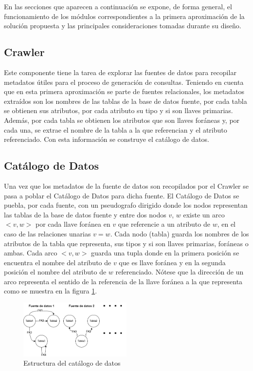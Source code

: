 En las secciones que aparecen a continuación se expone, de forma general, el funcionamiento de los módulos correspondientes a la primera 
aproximación de la solución propuesta y las principales consideraciones tomadas durante
su diseño.

\subsection{Crawler}

Este componente tiene la tarea de explorar las fuentes de datos para recopilar metadatos \'utiles para el proceso de generación
de consultas. Teniendo en cuenta que en esta primera aproximación se parte de fuentes relacionales, los metadatos extra\'idos son 
los nombres de las tablas de la base de datos fuente, por cada tabla se obtienen sus 
atributos, por cada atributo su tipo y si son llaves primarias. Además, por cada tabla se obtienen los atributos que son llaves 
for\'aneas y, por cada una, se extrae el nombre de la tabla a la que referencian y el atributo referenciado. Con esta información se construye 
el catálogo de datos.

\subsection{Catálogo de Datos}

Una vez que los metadatos de la fuente de datos son recopilados por el Crawler se pasa a poblar el Catálogo de Datos para dicha fuente. 
El Cat\'alogo de Datos se puebla, por cada fuente, 
con un pseudografo dirigido donde los nodos representan las tablas de la base de datos fuente y entre dos nodos $v$, $w$ 
existe un arco $<v,w>$ por cada llave for\'anea en $v$ que referencie a un atributo de $w$, en el caso de las relaciones unarias $v=w$. Cada nodo 
(tabla) guarda los nombres de los atributos de la tabla que representa, sus tipos y si son llaves primarias, for\'aneas o ambas. Cada arco $<v,w>$ 
guarda una tupla donde en la primera posición se encuentra el nombre del atributo de $v$ que es llave for\'anea y en la segunda 
posición el nombre del atributo de $w$ referenciado. Nótese que la dirección de un arco representa el sentido de la 
referencia de la llave for\'anea a la que representa como se muestra en la figura \ref{fig:datacatalogproposal}.

\begin{figure}[htb]
    \centering
    \includegraphics[width=0.5\textwidth]{Graphics/data_catalog.drawio.png}
    \caption{Estructura del catálogo de datos}
    \label{fig:datacatalogproposal}
\end{figure}

